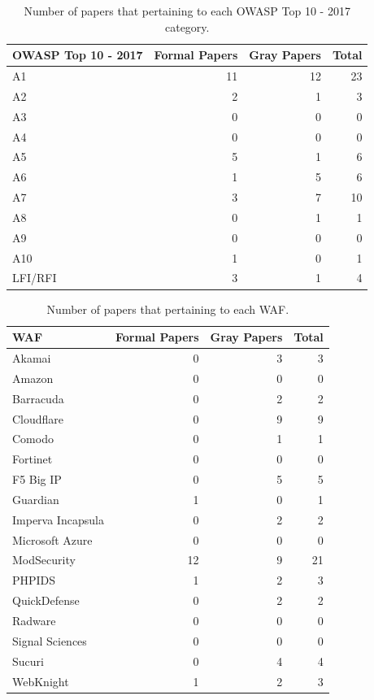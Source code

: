 \begin{table}[!htbp]
\begin{tabular}{|l|r|r|r|}
\hline
\textbf{OWASP Top 10 - 2017}
& \textbf{Formal Papers}
& \textbf{Gray Papers}
& \textbf{Total}
\\ \hline
A1 & 11 & 12 & 23
\\ \hline
A2 & 2 & 1 & 3
\\ \hline
A3 & 0 & 0 & 0
\\ \hline
A4 & 0 & 0 & 0
\\ \hline
A5 & 5 & 1 & 6
\\ \hline
A6 & 1 & 5 & 6
\\ \hline
A7 & 3 & 7 & 10
\\ \hline
A8 & 0 & 1 & 1
\\ \hline
A9 & 0 & 0 & 0
\\ \hline
A10 & 1 & 0 & 1
\\ \hline
LFI/RFI & 3 & 1 & 4
\\ \hline

\end{tabular}
  \caption{Number of papers that pertaining to each OWASP Top 10 - 2017 category.}
  \label{Tab:papers_owasp}
\end{table}

\begin{table}[!htbp]
\begin{tabular}{|l|r|r|r|}
\hline
\textbf{WAF}
& \textbf{Formal Papers}
& \textbf{Gray Papers}
& \textbf{Total}
\\ \hline
Akamai & 0 & 3 & 3
\\ \hline
Amazon & 0 & 0 & 0
\\ \hline
Barracuda & 0 & 2 & 2
\\ \hline
Cloudflare & 0 & 9 & 9
\\ \hline
Comodo & 0 & 1 & 1
\\ \hline
Fortinet & 0 & 0 & 0
\\ \hline
F5 Big IP & 0 & 5 & 5
\\ \hline
Guardian & 1 & 0 & 1
\\ \hline
Imperva Incapsula & 0 & 2 & 2
\\ \hline
Microsoft Azure & 0 & 0 & 0
\\ \hline
ModSecurity & 12 & 9 & 21
\\ \hline
PHPIDS & 1 & 2 & 3
\\ \hline
QuickDefense & 0 & 2 & 2
\\ \hline
Radware & 0 & 0 & 0
\\ \hline
Signal Sciences & 0 & 0 & 0
\\ \hline
Sucuri & 0 & 4 & 4
\\ \hline
WebKnight & 1 & 2 & 3
\\ \hline

\end{tabular}
  \caption{Number of papers that pertaining to each WAF.}
  \label{Tab:papers_waf}
\end{table}


